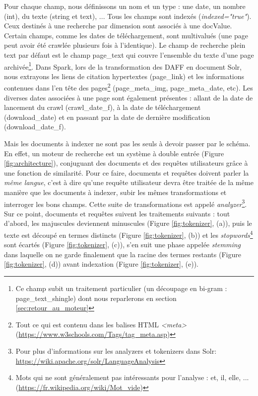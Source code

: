 \documentclass[symmetric,justified,marginals=raggedouter]{tufte-book}
\begin{document}
\noindent Pour chaque champ, nous définissons un nom et un type : une date, un nombre (int), du texte (string et text), ... Tous les champs sont indexés (\textit{indexed="true"}). Ceux destinés à une recherche par dimension sont associés à une docValue. Certain champs, comme les dates de téléchargement, sont multivalués (une page peut avoir été crawlée plusieurs fois à l'identique). Le champ de recherche plein text par défaut est le champ page\_text qui couvre l'ensemble du texte d'une page archivée\footnote{Ce champ subit un traitement particulier (un découpage en bi-gram : page\_text\_shingle) dont nous reparlerons en section \ref{sec:retour_au_moteur}}. Dans Spark, lors de la transformation des DAFF en document Solr, nous extrayons les liens de citation hypertextes (page\_link) et les informations contenues dans l'en tête des pages\footnote{Tout ce qui est contenu dans les balises HTML \textit{<meta>} (\url{https://www.w3schools.com/Tags/tag_meta.asp})} (page\_meta\_img, page\_meta\_date, etc). Les diverses dates associées à une page sont également présentes : allant de la date de lancement du crawl (crawl\_date\_f), à la date de téléchargement (download\_date) et en passant par la date de dernière modification (download\_date\_f).

Mais les documents à indexer ne sont pas les seuls à devoir passer par le schéma. En effet, un moteur de recherche est un système à double entrée (Figure \ref{fig:architecture}), conjuguant des documents et des requêtes utilisateurs grâce à une fonction de similarité. Pour ce faire, documents et requêtes doivent parler la \textit{même langue}, c'est à dire qu'une requête utilisateur devra être traitée de la même manière que les documents à indexer, subir les mêmes transformations et interroger les bons champs. Cette suite de transformations est appelé \textit{analyzer}\footnote{Pour plus d'informations sur les analyzers et tokenizers dans Solr: \url{https://wiki.apache.org/solr/LanguageAnalysis}}. Sur ce point, documents et requêtes suivent les traitements suivants : tout d'abord, les majuscules deviennent minuscules (Figure \ref{fig:tokenizer}, (a)), puis le texte est découpé en termes distincts (Figure \ref{fig:tokenizer}, (b)) et les \textit{stopwords}\footnote{Mots qui ne sont généralement pas intéressants pour l'analyse : et, il, elle, ... (\url{https://fr.wikipedia.org/wiki/Mot_vide})} sont écartés (Figure \ref{fig:tokenizer}, (c)), s'en suit une phase appelée \textit{stemming} dans laquelle on ne garde finalement que la racine des termes restants (Figure \ref{fig:tokenizer}, (d)) avant indexation (Figure \ref{fig:tokenizer}, (e)).
\end{document}
